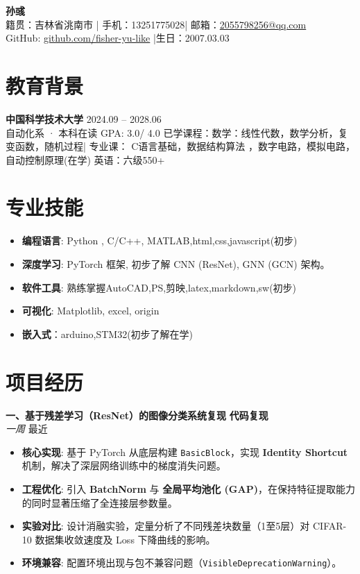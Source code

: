 \documentclass[11pt,a4paper]{article}
\begin{document}
\begin{center}
     {\Huge{} \textbf{孙彧} }\\
    \vspace{5pt}
    籍贯：吉林省洮南市 | 手机：13251775028| 邮箱：\href{mailto:2055798256@qq.com}{2055798256@qq.com} \\
    GitHub: \href{https://github.com/fisher-yu-like}{github.com/fisher-yu-like} |生日：2007.03.03

\end{center}
\section{教育背景}
\textbf{中国科学技术大学 } \hfill 2024.09 -- 2028.06 \\
自动化系 · 本科在读 \hfill GPA: 3.0/ 4.0
已学课程：数学：线性代数，数学分析，复变函数，随机过程| 专业课： C语言基础，数据结构算法 ，数字电路，模拟电路，自动控制原理(在学)
英语：六级550+
\section{专业技能}
\begin{itemize}[leftmargin=1.5em, itemsep=0pt]
    \item \textbf{编程语言}: Python , C/C++, MATLAB,html,css,javascript(初步)
    \item \textbf{深度学习}: PyTorch 框架, 初步了解 CNN (ResNet), GNN (GCN) 架构。
    \item \textbf{软件工具}: 熟练掌握AutoCAD,PS,剪映,latex,markdown,sw(初步)
    \item \textbf{可视化}: Matplotlib, excel, origin
    \item \textbf{嵌入式}：arduino,STM32(初步了解在学)
\end{itemize}

\section{项目经历}

\textbf{一、基于残差学习（ResNet）的图像分类系统复现} \hfill \textbf{代码复现} \\
\textit{一周} \hfill 最近
\begin{itemize}[leftmargin=1.5em, itemsep=2pt]
    \item \textbf{核心实现}: 基于 PyTorch 从底层构建 \texttt{BasicBlock}，实现 \textbf{Identity Shortcut} 机制，解决了深层网络训练中的梯度消失问题。
    \item \textbf{工程优化}: 引入 \textbf{BatchNorm} 与 \textbf{全局平均池化 (GAP)}，在保持特征提取能力的同时显著压缩了全连接层参数量。
    \item \textbf{实验对比}: 设计消融实验，定量分析了不同残差块数量（1至5层）对 CIFAR-10 数据集收敛速度及 Loss 下降曲线的影响。
    \item \textbf{环境兼容}: 配置环境出现与包不兼容问题（\texttt{VisibleDeprecationWarning}）。
\end{itemize}
\end{document}
